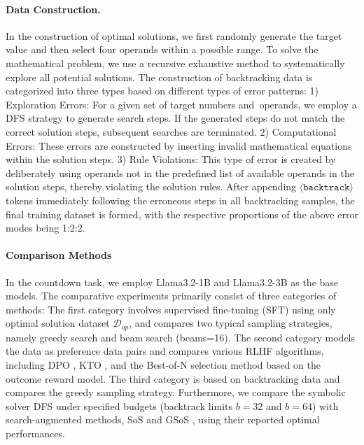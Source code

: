 \documentclass{article}
\theoremstyle{plain}
\theoremstyle{definition}
\theoremstyle{remark}
\begin{document}
\paragraph{Data Construction.}
In the construction of optimal solutions, we first randomly generate the target value and then select four operands within a possible range. To solve the mathematical problem, we use a recursive exhaustive method to systematically explore all potential solutions.
The construction of backtracking data is categorized into three types based on different types of error patterns:
1) Exploration Errors: For a given set of target numbers and operands, we employ a DFS strategy to generate search steps. If the generated steps do not match the correct solution steps, subsequent searches are terminated.
2) Computational Errors: These errors are constructed by inserting invalid mathematical equations within the solution steps.
3) Rule Violations: This type of error is created by deliberately using operands not in the predefined list of available operands in the solution steps, thereby violating the solution rules.
After appending $\langle \texttt{backtrack} \rangle$ tokens immediately following the erroneous steps in all backtracking samples, the final training dataset is formed, with the respective proportions of the above error modes being 1:2:2.


\paragraph{Comparison Methods}
In the countdown task, we employ Llama3.2-1B \cite{llama3} and Llama3.2-3B \cite{llama3} as the base models. The comparative experiments primarily consist of three categories of methods: The first category involves supervised fine-tuning (SFT) using only optimal solution dataset $\mathcal{D}_{op}$, and compares two typical sampling strategies, namely greedy search and beam search (beams=16). The second category models the data as preference data pairs and compares various RLHF algorithms, including DPO \cite{dpo}, KTO \cite{kto}, and the Best-of-N \cite{bonw} selection method based on the outcome reward model. The third category is based on backtracking data and compares the greedy sampling strategy. Furthermore, we compare the symbolic solver DFS under specified budgets (backtrack limits $b=32$ and $b=64$) with search-augmented methods, SoS \cite{sos} and GSoS \cite{gsos}, using their reported optimal performances.
\end{document}
